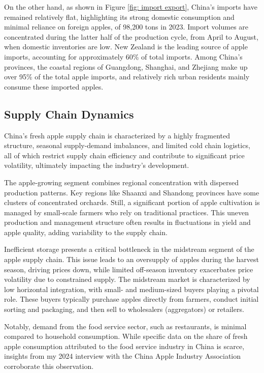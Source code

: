 On the other hand, as shown in Figure \ref{fig: import export}, China's imports have remained relatively flat, highlighting its strong domestic consumption and minimal reliance on foreign apples, of 98,200 tons in 2023.  Import volumes are concentrated during the latter half of the production cycle, from April to August, when domestic inventories are low. New Zealand is the leading source of apple imports, accounting for approximately 60\% of total imports. Among China's provinces, the coastal regions of Guangdong, Shanghai, and Zhejiang make up over 95\% of the total apple imports, and relatively rich urban residents mainly consume these imported apples.





    
\subsection{Supply Chain Dynamics}
\noindent China's fresh apple supply chain is characterized by a highly fragmented structure, seasonal supply-demand imbalances, and limited cold chain logistics, all of which restrict supply chain efficiency and contribute to significant price volatility, ultimately impacting the industry's development.

The apple-growing segment combines regional concentration with dispersed production patterns. Key regions like Shaanxi and Shandong provinces have some clusters of concentrated orchards. Still, a significant portion of apple cultivation is managed by small-scale farmers who rely on traditional practices. This uneven production and management structure often results in fluctuations in yield and apple quality, adding variability to the supply chain.

Inefficient storage presents a critical bottleneck in the midstream segment of the apple supply chain. This issue leads to an oversupply of apples during the harvest season, driving prices down, while limited off-season inventory exacerbates price volatility due to constrained supply. The midstream market is characterized by low horizontal integration, with small- and medium-sized buyers playing a pivotal role. These buyers typically purchase apples directly from farmers, conduct initial sorting and packaging, and then sell to wholesalers (aggregators) or retailers. 

Notably, demand from the food service sector, such as restaurants, is minimal compared to household consumption. While specific data on the share of fresh apple consumption attributed to the food service industry in China is scarce, insights from my 2024 interview with the China Apple Industry Association corroborate this observation.



